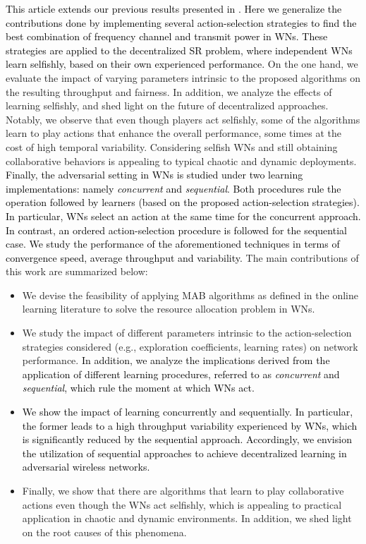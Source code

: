 \documentclass{article}
\begin{document}
	\textcolor{black}{This article extends our previous results presented in \cite{wilhelmi2017implications}. Here we generalize the contributions done by implementing several action-selection strategies to find the best combination of frequency channel and transmit power in WNs. These strategies are applied to the decentralized SR problem, where independent WNs learn selfishly, based on their own experienced performance.} On the one hand, we evaluate the impact of varying parameters intrinsic to the proposed algorithms on the resulting throughput and fairness. In addition, we analyze the effects of learning selfishly, and shed light on the future of decentralized approaches. Notably, we observe that even though players act selfishly, some of the algorithms learn to play actions that enhance the overall performance, some times at the cost of high temporal variability. Considering selfish WNs and still obtaining collaborative behaviors is appealing to typical chaotic and dynamic deployments. \textcolor{black}{Finally, the adversarial setting in WNs is studied under two learning implementations: namely \textit{concurrent} and \textit{sequential}. Both procedures rule the operation followed by learners (based on the proposed action-selection strategies). In particular, WNs select an action at the same time for the concurrent approach. In contrast, an ordered action-selection procedure is followed for the sequential case. We study the performance of the aforementioned techniques in terms of convergence speed, average throughput and variability.} The main contributions of this work are summarized below:
	\begin{itemize}		
		\item We devise the feasibility of applying MAB algorithms as defined in the online learning literature to solve the resource allocation problem in WNs.
		\item We study the impact of different parameters intrinsic to the action-selection strategies considered (e.g., exploration coefficients, learning rates) on network performance. \textcolor{black}{In addition, we analyze the implications derived from the application of different learning procedures, referred to as \textit{concurrent} and \textit{sequential}, which rule the moment at which WNs act.}
		\item \textcolor{black}{We show the impact of learning concurrently and sequentially. In particular, the former leads to a high throughput variability experienced by WNs, which is significantly reduced by the sequential approach.} \textcolor{black}{Accordingly, we envision the utilization of sequential approaches to achieve decentralized learning in adversarial wireless networks.}
		\item Finally, we show that there are algorithms that learn to play collaborative actions even though the WNs act selfishly, which is appealing to practical application in chaotic and dynamic environments. In addition, we shed light on the root causes of this phenomena.  
	\end{itemize}
	
\end{document}
